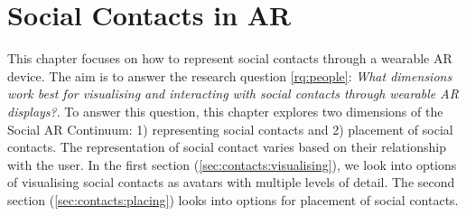 \chapter{Social Contacts in AR}
\label{ch:contacts} 

This chapter focuses on how to represent social contacts through a wearable AR device. The aim is to answer the research question \ref{rq:people}: \textit{What dimensions work best for visualising and interacting with social contacts through wearable AR displays?}. To answer this question, this chapter explores two dimensions of the Social AR Continuum: 1) representing social contacts and 2) placement of social contacts. The representation of social contact varies based on their relationship with the user. 
In the first section (\ref{sec:contacts:visualising}), we look into options of visualising social contacts as avatars with multiple levels of detail. The second section (\ref{sec:contacts:placing}) looks into options for placement of social contacts. 





